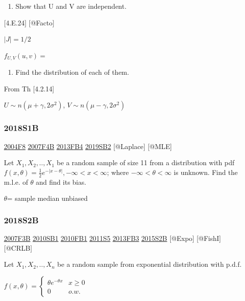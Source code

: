 \documentclass[6pt,Portrait]{article}
\providecommand{\tightlist}{%
  \setlength{\itemsep}{0pt}\setlength{\parskip}{0pt}}
\begin{document}
\begin{enumerate}
\def\labelenumi{(\alph{enumi})}
\tightlist
\item
  Show that U and V are independent.
\end{enumerate}

{[}4.E.24{]} {[}@Facto{]}

\(|J|=1/2\)

\(f_{U,V}(u,v)=\)

\begin{enumerate}
\def\labelenumi{(\alph{enumi})}
\setcounter{enumi}{1}
\tightlist
\item
  Find the distribution of each of them.
\end{enumerate}

From Th {[}4.2.14{]}

\(U\sim n(\mu+\gamma,2\sigma^2)\), \(V\sim n(\mu-\gamma,2\sigma^2)\)

\hypertarget{s1b-2}{%
\subsubsection{2018S1B}\label{s1b-2}}

\protect\hyperlink{f8-2}{2004F8} \protect\hyperlink{f4b}{2007F4B}
\protect\hyperlink{fb4-2}{2013FB4} \protect\hyperlink{sb2-3}{2019SB2}
{[}@Laplace{]} {[}@MLE{]}

Let \(X_1,X_2,..,X_1\) be a random sample of size 11 from a distribution
with pdf \(f(x,\theta) =\frac12e^{-|x-\theta|}, -\infty<x<\infty\);
where \(-\infty<\theta<\infty\) is unknown. Find the m.l.e. of
\(\theta\) and find its bias.

\(\theta\)= sample median unbiased

\hypertarget{s2b-2}{%
\subsubsection{2018S2B}\label{s2b-2}}

\protect\hyperlink{f3b}{2007F3B} \protect\hyperlink{sb1-1}{2010SB1}
\protect\hyperlink{fb1-1}{2010FB1} \protect\hyperlink{s5-2}{2011S5}
\protect\hyperlink{fb3-2}{2013FB3} \protect\hyperlink{s2b-1}{2015S2B}
{[}@Expo{]} {[}@FishI{]} {[}@CRLB{]}

Let \(X_1,X_2,..,X_n\) be a random sample from exponential distribution
with p.d.f.

\(f(x,\theta)=\begin{cases}\theta e^{-\theta x}& x\ge0\\0& o.w.\end{cases}\)
\end{document}
